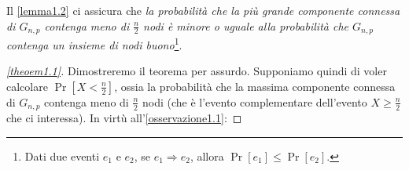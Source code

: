 \begin{osservazione}\label{osservazione1.1}
    Il \autoref{lemma1.2} ci assicura che \textit{la probabilità che la più grande componente connessa di $G_{n,p}$ contenga meno di $\frac{n}{2}$ nodi è minore o uguale alla probabilità che $G_{n,p}$ contenga un insieme di nodi buono}\footnote{Dati due eventi $e_1$ e $e_2$, se $e_1 \Rightarrow e_2$, allora $\Pr[e_1] \leq \Pr[e_2]$.}.
\end{osservazione}

\newpage

\begin{proof}[\autoref{theoem1.1}]
    Dimostreremo il teorema per assurdo. Supponiamo quindi di voler calcolare $\Pr[X < \frac{n}{2}]$, ossia la probabilità che la massima componente connessa di $G_{n,p}$ contenga meno di $\frac{n}{2}$ nodi (che è l'evento complementare dell'evento $X \geq \frac{n}{2}$ che ci interessa).
    In virtù all'\autoref{osservazione1.1}:


\end{proof}
